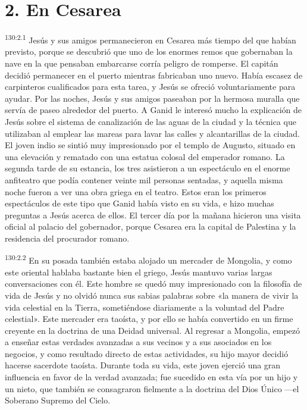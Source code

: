 \section*{2. En Cesarea}
\par
\textsuperscript{130:2.1} Jesús y sus amigos permanecieron en Cesarea más tiempo del que habían previsto, porque se descubrió que uno de los enormes remos que gobernaban la nave en la que pensaban embarcarse corría peligro de romperse. El capitán decidió permanecer en el puerto mientras fabricaban uno nuevo. Había escasez de carpinteros cualificados para esta tarea, y Jesús se ofreció voluntariamente para ayudar. Por las noches, Jesús y sus amigos paseaban por la hermosa muralla que servía de paseo alrededor del puerto. A Ganid le interesó mucho la explicación de Jesús sobre el sistema de canalización de las aguas de la ciudad y la técnica que utilizaban al emplear las mareas para lavar las calles y alcantarillas de la ciudad. El joven indio se sintió muy impresionado por el templo de Augusto, situado en una elevación y rematado con una estatua colosal del emperador romano. La segunda tarde de su estancia, los tres asistieron a un espectáculo en el enorme anfiteatro que podía contener veinte mil personas sentadas, y aquella misma noche fueron a ver una obra griega en el teatro. Estos eran los primeros espectáculos de este tipo que Ganid había visto en su vida, e hizo muchas preguntas a Jesús acerca de ellos. El tercer día por la mañana hicieron una visita oficial al palacio del gobernador, porque Cesarea era la capital de Palestina y la residencia del procurador romano.

\par
\textsuperscript{130:2.2} En su posada también estaba alojado un mercader de Mongolia, y como este oriental hablaba bastante bien el griego, Jesús mantuvo varias largas conversaciones con él. Este hombre se quedó muy impresionado con la filosofía de vida de Jesús y no olvidó nunca sus sabias palabras sobre «la manera de vivir la vida celestial en la Tierra, sometiéndose diariamente a la voluntad del Padre celestial». Este mercader era taoísta, y por ello se había convertido en un firme creyente en la doctrina de una Deidad universal. Al regresar a Mongolia, empezó a enseñar estas verdades avanzadas a sus vecinos y a sus asociados en los negocios, y como resultado directo de estas actividades, su hijo mayor decidió hacerse sacerdote taoísta. Durante toda su vida, este joven ejerció una gran influencia en favor de la verdad avanzada; fue sucedido en esta vía por un hijo y un nieto, que también se consagraron fielmente a la doctrina del Dios Único ---el Soberano Supremo del Cielo.

